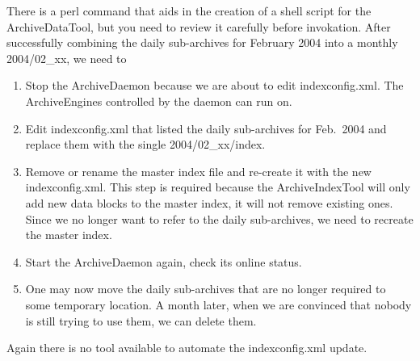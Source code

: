 There is a perl command  that aids in the
creation of a shell script for the ArchiveDataTool, but you need to
review it carefully before invokation.
After successfully combining the daily sub-archives for February 2004
into a monthly 2004/02\_xx, we need to
\begin{enumerate}
\item Stop the ArchiveDaemon because we are about to edit
      indexconfig.xml.
      The ArchiveEngines controlled by the daemon can run on.
\item Edit indexconfig.xml that listed the daily sub-archives for
      Feb.\ 2004 and replace them with the single 2004/02\_xx/index.
\item Remove or rename the master index file and re-create it with the new
      indexconfig.xml. This step is required because the ArchiveIndexTool
      will only add new data blocks to the master index, it will not
      remove existing ones. Since we no longer want to refer to the
      daily sub-archives, we need to recreate the master index.
\item Start the ArchiveDaemon again, check its online status.
\item One may now move the daily sub-archives that are no longer
      required to some temporary location. A month later, when we are
      convinced that nobody is still trying to use them, we can delete
      them.
\end{enumerate}

\noindent Again there is no tool available to automate the
indexconfig.xml update.
